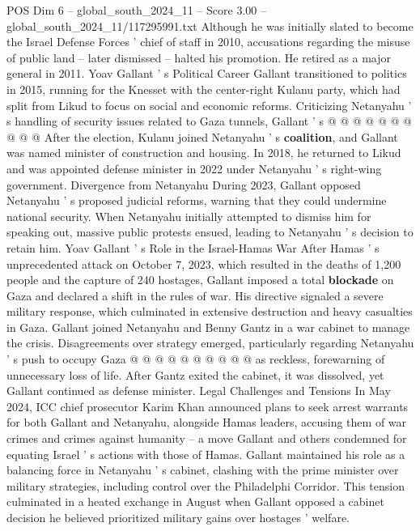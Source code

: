 \begin{textsample}{POS Dim 6 – global\_south\_2024\_11 – Score 3.00 – global\_south\_2024\_11/117295991.txt}
Although he was initially slated to become the Israel Defense Forces ' chief of staff in 2010, accusations regarding the misuse of public land -- later dismissed -- halted his promotion.
He retired as a major general in 2011.
Yoav Gallant ' s Political Career Gallant transitioned to politics in 2015, running for the Knesset with the center-right Kulanu party, which had split from Likud to focus on social and economic reforms.
Criticizing Netanyahu ' s handling of security issues related to Gaza tunnels, Gallant ' s @ @ @ @ @ @ @ @ @ @ After the election, Kulanu joined Netanyahu ' s \textbf{coalition}, and Gallant was named minister of construction and housing.
In 2018, he returned to Likud and was appointed defense minister in 2022 under Netanyahu ' s right-wing government.
Divergence from Netanyahu During 2023, Gallant opposed Netanyahu ' s proposed judicial reforms, warning that they could undermine national security.
When Netanyahu initially attempted to dismiss him for speaking out, massive public protests ensued, leading to Netanyahu ' s decision to retain him.
Yoav Gallant ' s Role in the Israel-Hamas War After Hamas ' s unprecedented attack on October 7, 2023, which resulted in the deaths of 1,200 people and the capture of 240 hostages, Gallant imposed a total \textbf{blockade} on Gaza and declared a shift in the rules of war.
His directive signaled a severe military response, which culminated in extensive destruction and heavy casualties in Gaza.
Gallant joined Netanyahu and Benny Gantz in a war cabinet to manage the crisis.
Disagreements over strategy emerged, particularly regarding Netanyahu ' s push to occupy Gaza @ @ @ @ @ @ @ @ @ @ as reckless, forewarning of unnecessary loss of life.
After Gantz exited the cabinet, it was dissolved, yet Gallant continued as defense minister.
Legal Challenges and Tensions In May 2024, ICC chief prosecutor Karim Khan announced plans to seek arrest warrants for both Gallant and Netanyahu, alongside Hamas leaders, accusing them of war crimes and crimes against humanity -- a move Gallant and others condemned for equating Israel ' s actions with those of Hamas.
Gallant maintained his role as a balancing force in Netanyahu ' s cabinet, clashing with the prime minister over military strategies, including control over the Philadelphi Corridor.
This tension culminated in a heated exchange in August when Gallant opposed a cabinet decision he believed prioritized military gains over hostages ' welfare.

\end{textsample}
